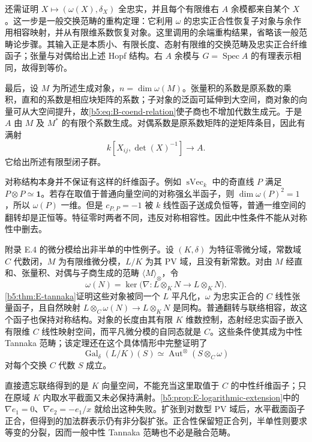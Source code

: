\begin{proofsketch}
	还需证明 \(X\mapsto(\omega(X),\delta_X)\) 全忠实，并且每个有限维右 \(A\) 余模都来自某个 \(X\)。这一步是一般交换范畴的重构定理：它利用 \(\omega\) 的忠实正合性恢复子对象与余作用相容映射，并从有限维系数恢复对象。这里调用\cite[Theorem 1.10.1, pp. 14--15; Theorem 5.4.1, p. 98]{EtingofEtAl2015TensorCategories}的余端重构结果，省略该一般范畴论步骤。其输入正是本质小、有限长度、态射有限维的交换范畴及忠实正合纤维函子；张量与对偶给出上述 Hopf 结构。右 \(A\) 余模与 \(G=\operatorname{Spec}A\) 的有理表示相同，故得到等价。

	最后，设 \(M\) 为所述生成对象，\(n=\dim\omega(M)\)。张量积的系数是原系数的乘积，直和的系数是相应块矩阵的系数；子对象的泛函可延伸到大空间，商对象的向量可从大空间提升，故\eqref{b5:eq:B-coend-relation}使子商也不增加代数生成元。于是 \(A\) 由 \(M\) 及 \(M^*\) 的有限个系数生成。对偶系数是原系数矩阵的逆矩阵条目，因此有满射
	\[
		k[X_{ij},\det(X)^{-1}]\longrightarrow A.
	\]
	它给出所述有限型闭子群。
\end{proofsketch}

对称结构本身并不保证有这样的纤维函子。例如 \(\operatorname{sVec}_k\) 中的奇直线 \(P\) 满足 \(P\otimes P\simeq\mathbf1\)。若存在取值于普通向量空间的对称强幺半函子，则 \(\dim\omega(P)^2=1\)，所以 \(\omega(P)\) 一维。但是 \(c_{P,P}=-1\) 被 \(k\) 线性函子送成负恒等，普通一维空间的翻转却是正恒等。特征零时两者不同，违反对称相容性。因此中性条件不能从对称性中删去。

\ProseParagraphBreak
附录 E.4 的微分模给出非半单的中性例子。设 \((K,\delta)\) 为特征零微分域，常数域 \(C\) 代数闭，\(M\) 为有限维微分模，\(L/K\) 为其 PV 域，且没有新常数。对由 \(M\) 经直和、张量积、对偶与子商生成的范畴 \(\langle M\rangle_\otimes\)，令
\[
	\omega(N)=\ker\bigl(\nabla:L\otimes_KN\to L\otimes_KN\bigr).
\]
\cref{b5:thm:E-tannaka}证明这些对象被同一个 \(L\) 平凡化，\(\omega\) 为忠实正合的 \(C\) 线性张量函子，且自然映射 \(L\otimes_C\omega(N)\to L\otimes_KN\) 是同构。普通翻转与联络相容，故这个函子也保持对称结构。对象的长度由其有限 \(K\) 维数控制，态射经忠实函子嵌入有限维 \(C\) 线性映射空间，而平凡微分模的自同态就是 \(C\)。这些条件使其成为中性 Tannaka 范畴；该定理还在这个具体情形中完整证明了
\[
	\operatorname{Gal}_\delta(L/K)(S)
	\simeq\operatorname{Aut}^{\otimes}(S\otimes_C\omega)
\]
对每个交换 \(C\) 代数 \(S\) 成立。

\ProseParagraphBreak
直接遗忘联络得到的是 \(K\) 向量空间，不能充当这里取值于 \(C\) 的中性纤维函子；只在原域 \(K\) 内取水平截面又未必保持满射。\cref{b5:prop:E-logarithmic-extension}中的 \(\nabla e_1=0\)、\(\nabla e_2=-e_1/x\) 就给出这种失败。扩张到对数型 PV 域后，水平截面函子正合，但得到的加法群表示仍有非分裂扩张。正合性保留短正合列，半单性则要求等变的分裂，因而一般中性 Tannaka 范畴也不必是融合范畴。

